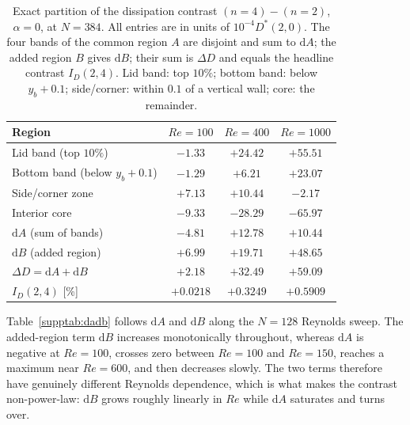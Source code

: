 \begin{table}[!htbp]
\centering
\caption{Exact partition of the dissipation contrast $(n{=}4)-(n{=}2)$, $\alpha=0$, at $N=384$. All entries are in units of $10^{-4}D^*(2,0)$. The four bands of the common region $A$ are disjoint and sum to $\mathrm{d}A$; the added region $B$ gives $\mathrm{d}B$; their sum is $\Delta D$ and equals the headline contrast $I_D(2,4)$. Lid band: top $10\%$; bottom band: below $y_b+0.1$; side/corner: within $0.1$ of a vertical wall; core: the remainder.}
\label{supptab:layers}
\begin{tabular}{@{}lccc@{}}
\hline
Region & $Re=100$ & $Re=400$ & $Re=1000$ \\
\hline
Lid band (top $10\%$)         & $-1.33$ & $+24.42$ & $+55.51$ \\
Bottom band (below $y_b{+}0.1$)& $-1.29$ & $+6.21$ & $+23.07$ \\
Side/corner zone              & $+7.13$ & $+10.44$ & $-2.17$ \\
Interior core                 & $-9.33$ & $-28.29$ & $-65.97$ \\
\hline
$\mathrm{d}A$ (sum of bands)  & $-4.81$ & $+12.78$ & $+10.44$ \\
$\mathrm{d}B$ (added region)  & $+6.99$ & $+19.71$ & $+48.65$ \\
\hline
$\Delta D=\mathrm{d}A+\mathrm{d}B$ & $+2.18$ & $+32.49$ & $+59.09$ \\
$I_D(2,4)$ [\%]               & $+0.0218$ & $+0.3249$ & $+0.5909$ \\
\hline
\end{tabular}
\end{table}

Table~\ref{supptab:dadb} follows $\mathrm{d}A$ and $\mathrm{d}B$ along the $N=128$ Reynolds sweep. The added-region term $\mathrm{d}B$ increases monotonically throughout, whereas $\mathrm{d}A$ is negative at $Re=100$, crosses zero between $Re=100$ and $Re=150$, reaches a maximum near $Re=600$, and then decreases slowly. The two terms therefore have genuinely different Reynolds dependence, which is what makes the contrast non-power-law: $\mathrm{d}B$ grows roughly linearly in $Re$ while $\mathrm{d}A$ saturates and turns over.

